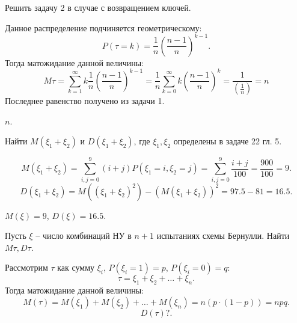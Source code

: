 \medskip
\begin{task}{3}
  Решить задачу 2 в случае с возвращением ключей.
\end{task}

\begin{solution}
Данное распределение подчиняется геометрическому: \[
P(\tau = k) = \frac{1}{n} \left(\frac{n - 1}{n}\right)^{k - 1}
.\] Тогда матожидание данной величины: \[
M\tau = \sum_{k = 1}^{\infty} k \frac{1}{n} \left(\frac{n - 1}{n}\right)^{k - 1}  = \frac{1}{n}
\sum_{k = 0}^{\infty} k \left(\frac{n - 1}{n}\right)^{k} = \frac{1}{\left(\frac{1}{n}\right)} = n
\] Последнее равенство получено из задачи 1.
\end{solution}

\begin{result}
$n$.
\end{result}
\medskip
\begin{task}{6}
  Найти $M\left(\xi_1 + \xi_2\right)$ и $D\left(\xi_1 + \xi_2\right)$, где $\xi_1, \xi_2$ определены
  в задаче 22 гл. 5.
\end{task}

\begin{solution}
\[
M(\xi_1 + \xi_2) = \sum_{i, j = 0}^{9} \left(i + j\right) P(\xi_1 = i, \xi_2 = j) = \sum_{i, j =
0}^{9}\frac{i + j}{100} = \frac{900}{100} = 9
.\] 
\[
D(\xi_1 + \xi_2) = M(\left(\xi_1 + \xi_2\right)^{2}) - \left(M(\xi_1 + \xi_2)\right)^{2} = 97.5 - 81
= 16.5
.\] 
\end{solution}

\begin{result}
$M(\xi) = 9$, $D(\xi) = 16.5$.
\end{result}
\medskip
\begin{task}{7}
  Пусть $\xi$ --  число комбинаций НУ в $n + 1$ испытаниях схемы Бернулли. Найти $M\tau, D\tau$.
\end{task}

\begin{solution}
  Рассмотрим $\tau$ как сумму $\xi_i$, $P(\xi_i = 1) = p$, $P(\xi_i = 0) = q$: \[
\tau = \xi_1 + \xi_2 + \dots + \xi_n
.\] 
Тогда матожидание данной величины: \[
M(\tau) = M(\xi_1) + M(\xi_2) + \dots + M(\xi_n) = n(p \cdot (1 - p)) = npq
.\] 
\[
D(\tau) ?
.\] 
\end{solution}

